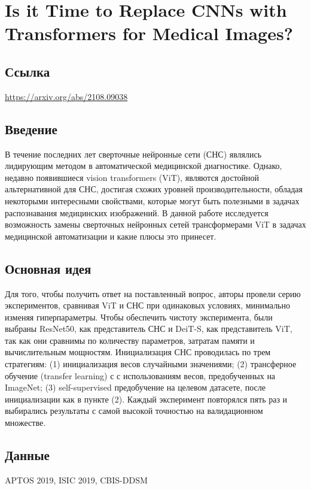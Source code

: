 \section{Is it Time to Replace CNNs with Transformers for Medical Images?}

\subsection*{Ссылка} \url{https://arxiv.org/abs/2108.09038}
\subsection*{Введение}
В течение последних лет сверточные нейронные сети (СНС)
являлись лидирующим методом в автоматической медицинской 
диагностике. Однако, недавно появившиеся vision transformers
(ViT), являются достойной альтернативной для СНС, достигая 
схожих уровней производительности, обладая некоторыми интересными свойствами,
которые могут быть полезными в задачах распознавания медицинских 
изображений. В данной работе исследуется возможность замены 
сверточных нейронных сетей трансформерами ViT в задачах 
медицинской автоматизации и какие плюсы это принесет. 
\subsection*{Основная идея}
Для того, чтобы получить ответ на поставленный вопрос, авторы
провели серию экспериментов, сравнивая ViT и СНС при одинаковых
условиях, минимально изменяя гиперпараметры. Чтобы обеспечить 
чистоту эксперимента, были выбраны ResNet50, как представитель СНС 
и DeiT-S, как представитель ViT, так как они сравнимы по 
количеству параметров, затратам памяти и вычислительным мощностям.
Инициализация СНС проводилась по трем стратегиям: (1) инициализация весов 
случайными значениями; (2) трансферное обучение (transfer learning) с 
с использованиям весов, предобученных на ImageNet; (3) self-supervised предобучение 
на целевом датасете, после инициализации как в пункте (2). Каждый эксперимент
повторялся пять раз и выбирались результаты с самой высокой точностью
на валидационном множестве.
\subsection*{Данные}
APTOS 2019, ISIC 2019, CBIS-DDSM
